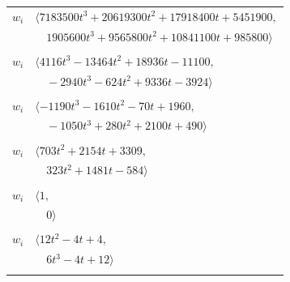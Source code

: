 \documentclass[11pt]{article}
\begin{document}
\begin{longtable}{@{}ll@{}}
$w_i$ & $\langle 7183500t^{3}+20619300t^{2}+17918400t+5451900,$\\
 & $\quad 1905600t^{3}+9565800t^{2}+10841100t+985800\rangle$\\
\addlinespace[2pt]
\multicolumn{2}{@{}p{0.97\textwidth}@{}}{$i=77$, $D_i=1$, $\rho_{ij}$: $1{:}2, \allowbreak 2{:}2, \allowbreak 3{:}2, \allowbreak 5{:}1, \allowbreak 19{:}1, \allowbreak 26{:}1, \allowbreak 30{:}1, \allowbreak 39{:}1, \allowbreak 61{:}2, \allowbreak 79{:}1, \allowbreak 83{:}1, \allowbreak 85{:}1, \allowbreak 89{:}1$}\\
$w_i$ & $\langle 4116t^{3}-13464t^{2}+18936t-11100,$\\
 & $\quad -2940t^{3}-624t^{2}+9336t-3924\rangle$\\
\addlinespace[2pt]
\multicolumn{2}{@{}p{0.97\textwidth}@{}}{$i=78$, $D_i=1$, $\rho_{ij}$: $0{:}1, \allowbreak 16{:}1, \allowbreak 17{:}1, \allowbreak 36{:}2, \allowbreak 56{:}1, \allowbreak 68{:}2, \allowbreak 70{:}2, \allowbreak 76{:}1, \allowbreak 86{:}2, \allowbreak 96{:}1$}\\
$w_i$ & $\langle -1190t^{3}-1610t^{2}-70t+1960,$\\
 & $\quad -1050t^{3}+280t^{2}+2100t+490\rangle$\\
\addlinespace[2pt]
\multicolumn{2}{@{}p{0.97\textwidth}@{}}{$i=79$, $D_i=1$, $\rho_{ij}$: $5{:}1, \allowbreak 17{:}2, \allowbreak 39{:}2, \allowbreak 40{:}2, \allowbreak 42{:}1, \allowbreak 55{:}2, \allowbreak 60{:}1, \allowbreak 61{:}1, \allowbreak 63{:}1, \allowbreak 67{:}2, \allowbreak 69{:}1, \allowbreak 77{:}2, \allowbreak 93{:}1, \allowbreak 96{:}1$}\\
$w_i$ & $\langle 703t^{2}+2154t+3309,$\\
 & $\quad 323t^{2}+1481t-584\rangle$\\
\addlinespace[2pt]
\multicolumn{2}{@{}p{0.97\textwidth}@{}}{$i=80$, $D_i=1$, $\rho_{ij}$: $--$}\\
$w_i$ & $\langle 1,$\\
 & $\quad 0\rangle$\\
\addlinespace[2pt]
\multicolumn{2}{@{}p{0.97\textwidth}@{}}{$i=81$, $D_i=1$, $\rho_{ij}$: $3{:}2, \allowbreak 18{:}2, \allowbreak 27{:}1, \allowbreak 36{:}2, \allowbreak 56{:}1, \allowbreak 67{:}1, \allowbreak 84{:}1$}\\
$w_i$ & $\langle 12t^{2}-4t+4,$\\
 & $\quad 6t^{3}-4t+12\rangle$\\
\addlinespace[2pt]
\multicolumn{2}{@{}p{0.97\textwidth}@{}}{$i=82$, $D_i=1$, $\rho_{ij}$: $27{:}1, \allowbreak 31{:}1, \allowbreak 55{:}1, \allowbreak 60{:}1, \allowbreak 61{:}2, \allowbreak 63{:}2, \allowbreak 65{:}2, \allowbreak 68{:}1, \allowbreak 72{:}1, \allowbreak 74{:}2, \allowbreak 76{:}2, \allowbreak 83{:}2$}\\

\end{longtable}
\end{document}
